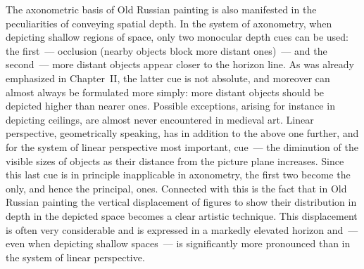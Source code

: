 

The axonometric basis of Old Russian painting is also manifested in the peculiarities of
conveying spatial depth.  In the system of axonometry, when depicting shallow regions
of space, only two monocular depth cues can be used: the first~--- occlusion (nearby
objects block more distant ones)~--- and the second~--- more distant objects appear
closer to the horizon line.  As was already emphasized in Chapter~II, the latter cue is
not absolute, and moreover can almost always be formulated more simply: more distant
objects should be depicted higher than nearer ones.  Possible exceptions, arising for
instance in depicting ceilings, are almost never encountered in medieval art.  Linear
perspective, geometrically speaking, has in addition to the above one further, and for
the system of linear perspective most important, cue~--- the diminution of the visible
sizes of objects as their distance from the picture plane increases.  Since this last cue
is in principle inapplicable in axonometry, the first two become the only, and hence
the principal, ones.  Connected with this is the fact that in Old Russian painting the
vertical displacement of figures to show their distribution in depth in the depicted space
becomes a clear artistic technique.  This displacement is often very considerable and
is expressed in a markedly elevated horizon and~--- even when depicting shallow
spaces~--- is significantly more pronounced than in the system of linear perspective.


